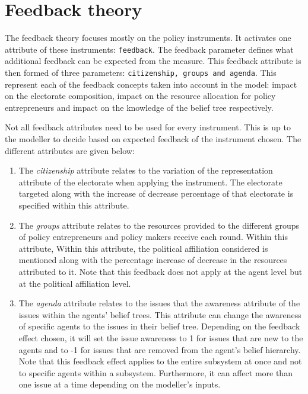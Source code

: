 \section{Feedback theory}

The feedback theory focuses mostly on the policy instruments. It activates one attribute of these instruments: \texttt{feedback}. The feedback parameter defines what additional feedback can be expected from the measure. This feedback attribute is then formed of three parameters: \texttt{citizenship, groups and agenda}. This represent each of the feedback concepts taken into account in the model: impact on the electorate composition, impact on the resource allocation for policy entrepreneurs and impact on the knowledge of the belief tree respectively.

Not all feedback attributes need to be used for every instrument. This is up to the modeller to decide based on expected feedback of the instrument chosen. The different attributes are given below:

\begin{enumerate}
\item The \emph{citizenship} attribute relates to the variation of the representation attribute of the electorate when applying the instrument. The electorate targeted along with the increase of decrease percentage of that electorate is specified within this attribute. 
\item The \emph{groups} attribute relates to the resources provided to the different groups of policy entrepreneurs and policy makers receive each round. Within this attribute, Within this attribute, the political affiliation considered is mentioned along with the percentage increase of decrease in the resources attributed to it. Note that this feedback does not apply at the agent level but at the political affiliation level.
\item The \emph{agenda} attribute relates to the issues that the awareness attribute of the issues within the agents’ belief trees. This attribute can change the awareness of specific agents to the issues in their belief tree. Depending on the feedback effect chosen, it will set the issue awareness to 1 for issues that are new to the agents and to -1 for issues that are removed from the agent’s belief hierarchy. Note that this feedback effect applies to the entire subsystem at once and not to specific agents within a subsystem. Furthermore, it can affect more than one issue at a time depending on the modeller’s inputs.
\end{enumerate}


